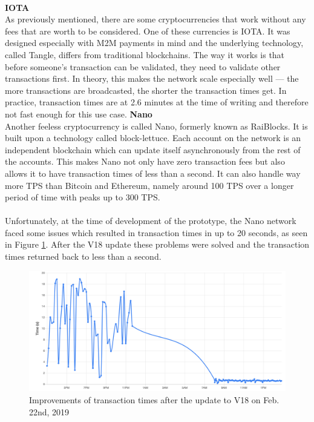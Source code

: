 \leavevmode
\\
\textbf{IOTA}\\
As previously mentioned, there are some cryptocurrencies that work without any fees that are worth to be considered.
One of these currencies is IOTA.
It was designed especially with M2M payments in mind and the underlying technology, called Tangle, differs from traditional blockchains.
The way it works is that before someone's transaction can be validated, they need to validate other transactions first\cite{tangle}.
In theory, this makes the network scale especially well — the more transactions are broadcasted, the shorter the transaction times get.
In practice, transaction times are at 2.6 minutes at the time of writing\cite{iota-time} and therefore not fast enough for this use case.
\newpage
\textbf{Nano}\\
Another feeless cryptocurrency is called Nano, formerly known as RaiBlocks.
It is built upon a technology called block-lettuce.
Each account on the network is an independent blockchain which can update itself asynchronously from the rest of the accounts.
This makes Nano not only have zero transaction fees but also allows it to have transaction times of less than a second.
It can also handle way more TPS than Bitcoin and Ethereum, namely around 100 TPS over a longer period of time with peaks up to 300 TPS\cite{nano-stress-test}.
\\\\
Unfortunately, at the time of development of the prototype, the Nano network faced some issues which resulted in transaction times in up to 20 seconds, as seen in Figure \ref{fig:NanoConfirmationTime}.
After the V18 update these problems were solved and the transaction times returned back to less than a second\cite{nano-confirmation-time}.
\begin{figure}[H]
    \includegraphics[width=\textwidth]{img/nano-confirmation-time.png}
    \caption{Improvements of transaction times after the update to V18 on Feb. 22nd, 2019\cite{nano-confirmation-time}}
    \label{fig:NanoConfirmationTime}
\end{figure}
